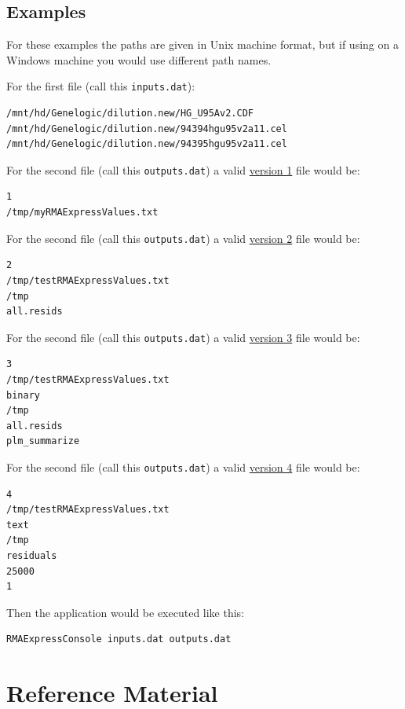 \documentclass[11pt]{report}
\begin{document}
\section{Examples}

For these examples the paths are given in Unix machine format, but if using on a Windows machine you would use different path names. 

\noindent For the first file (call this {\tt inputs.dat}):
\begin{verbatim}
/mnt/hd/Genelogic/dilution.new/HG_U95Av2.CDF
/mnt/hd/Genelogic/dilution.new/94394hgu95v2a11.cel
/mnt/hd/Genelogic/dilution.new/94395hgu95v2a11.cel
\end{verbatim}

\noindent For the second file (call this {\tt outputs.dat}) a valid \underline{version 1} file would be:
\begin{verbatim}
1
/tmp/myRMAExpressValues.txt
\end{verbatim}

\noindent  For the second file (call this {\tt outputs.dat}) a valid \underline{version 2} file would be:
\begin{verbatim}
2
/tmp/testRMAExpressValues.txt
/tmp
all.resids
\end{verbatim}

\noindent  For the second file (call this {\tt outputs.dat}) a valid \underline{version 3} file would be:
\begin{verbatim}
3
/tmp/testRMAExpressValues.txt
binary
/tmp
all.resids
plm_summarize
\end{verbatim}

\noindent  For the second file (call this {\tt outputs.dat}) a valid \underline{version 4} file would be:
\begin{verbatim}
4
/tmp/testRMAExpressValues.txt
text
/tmp
residuals
25000
1
\end{verbatim}



\noindent Then the application would be executed like this:
\begin{verbatim}
RMAExpressConsole inputs.dat outputs.dat
\end{verbatim}



\appendix

\chapter{Reference Material} \label{chap:referencematerial}
\end{document}

